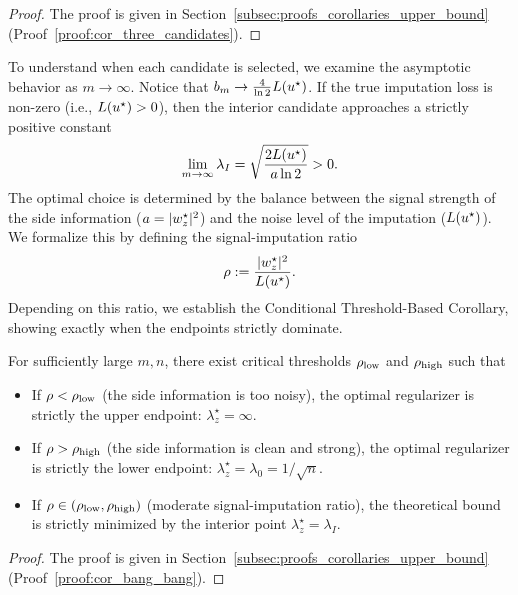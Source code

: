 \begin{proof}
The proof is given in Section~\ref{subsec:proofs_corollaries_upper_bound} (Proof~\ref{proof:cor_three_candidates}).
\end{proof}

To understand when each candidate is selected, we examine the asymptotic behavior as $m \to \infty$. Notice that $b_m \to \frac{4}{\ln 2} L(u^\star)$. If the true imputation loss is non-zero (i.e., $L(u^\star) > 0$), then the interior candidate approaches a strictly positive constant
\begin{equation}
    \lim_{m \to \infty} \lambda_I = \sqrt{\frac{2L(u^\star)}{a \ln 2}} > 0.
\end{equation}
The optimal choice is determined by the balance between the signal strength of the side information ($a = |w^\star_z|^2$) and the noise level of the imputation ($L(u^\star)$). We formalize this by defining the signal-imputation ratio
\begin{equation}
    \rho := \frac{|w^\star_z|^2}{L(u^\star)}.
\end{equation}
Depending on this ratio, we establish the Conditional Threshold-Based Corollary, showing exactly when the endpoints strictly dominate.

\begin{corollary}\label{cor: bang_bang}
For sufficiently large $m, n$, there exist critical thresholds $\rho_{\rm low}$ and $\rho_{\rm high}$ such that
\begin{itemize}
    \item If $\rho < \rho_{\rm low}$ (the side information is too noisy), the optimal regularizer is strictly the upper endpoint: $\lambda_z^\star = \infty$.
    \item If $\rho > \rho_{\rm high}$ (the side information is clean and strong), the optimal regularizer is strictly the lower endpoint: $\lambda_z^\star = \lambda_0 = 1/\sqrt{n}$.
    \item If $\rho \in (\rho_{\rm low}, \rho_{\rm high})$ (moderate signal-imputation ratio), the theoretical bound is strictly minimized by the interior point $\lambda_z^\star = \lambda_I$.
\end{itemize}
\end{corollary}

\begin{proof}
The proof is given in Section~\ref{subsec:proofs_corollaries_upper_bound} (Proof~\ref{proof:cor_bang_bang}).
\end{proof}